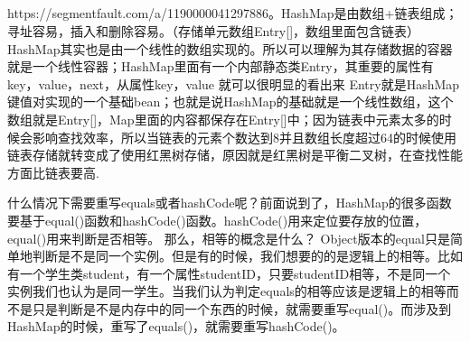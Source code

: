 \documentclass[../../../interview-questions.tex]{subfiles}
\begin{document}
\subsection{\color{red}{HashMap原理}}

https://segmentfault.com/a/1190000041297886。HashMap是由数组+链表组成；寻址容易，插入和删除容易。（存储单元数组Entry[]，数组里面包含链表）HashMap其实也是由一个线性的数组实现的。所以可以理解为其存储数据的容器就是一个线性容器；HashMap里面有一个内部静态类Entry，其重要的属性有key，value，next，从属性key，value 就可以很明显的看出来 Entry就是HashMap键值对实现的一个基础bean；也就是说HashMap的基础就是一个线性数组，这个数组就是Entry[]，Map里面的内容都保存在Entry[]中；因为链表中元素太多的时候会影响查找效率，所以当链表的元素个数达到8并且数组长度超过64的时候使用链表存储就转变成了使用红黑树存储，原因就是红黑树是平衡二叉树，在查找性能方面比链表要高.

什么情况下需要重写equals或者hashCode呢？前面说到了，HashMap的很多函数要基于equal()函数和hashCode()函数。hashCode()用来定位要存放的位置，equal()用来判断是否相等。
那么，相等的概念是什么？
Object版本的equal只是简单地判断是不是同一个实例。但是有的时候，我们想要的的是逻辑上的相等。比如有一个学生类student，有一个属性studentID，只要studentID相等，不是同一个实例我们也认为是同一学生。当我们认为判定equals的相等应该是逻辑上的相等而不是只是判断是不是内存中的同一个东西的时候，就需要重写equal()。而涉及到HashMap的时候，重写了equals()，就需要重写hashCode()。
\end{document}
